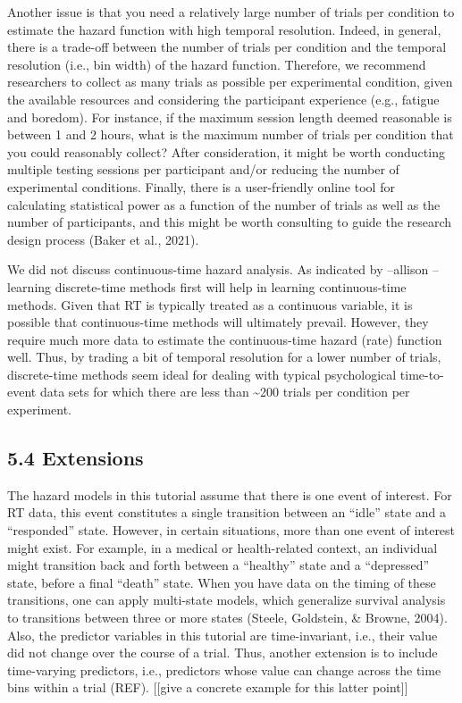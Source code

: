 \documentclass[
  man,floatsintext]{apa6}
\begin{document}
Another issue is that you need a relatively large number of trials per condition to estimate the hazard function with high temporal resolution. Indeed, in general, there is a trade-off between the number of trials per condition and the temporal resolution (i.e., bin width) of the hazard function. Therefore, we recommend researchers to collect as many trials as possible per experimental condition, given the available resources and considering the participant experience (e.g., fatigue and boredom). For instance, if the maximum session length deemed reasonable is between 1 and 2 hours, what is the maximum number of trials per condition that you could reasonably collect? After consideration, it might be worth conducting multiple testing sessions per participant and/or reducing the number of experimental conditions. Finally, there is a user-friendly online tool for calculating statistical power as a function of the number of trials as well as the number of participants, and this might be worth consulting to guide the research design process (Baker et al., 2021).

We did not discuss continuous-time hazard analysis. As indicated by --allison -- learning discrete-time methods first will help in learning continuous-time methods. Given that RT is typically treated as a continuous variable, it is possible that continuous-time methods will ultimately prevail. However, they require much more data to estimate the continuous-time hazard (rate) function well. Thus, by trading a bit of temporal resolution for a lower number of trials, discrete-time methods seem ideal for dealing with typical psychological time-to-event data sets for which there are less than \textasciitilde200 trials per condition per experiment.

\subsection{5.4 Extensions}\label{extensions}

The hazard models in this tutorial assume that there is one event of interest. For RT data, this event constitutes a single transition between an ``idle'' state and a ``responded'' state. However, in certain situations, more than one event of interest might exist. For example, in a medical or health-related context, an individual might transition back and forth between a ``healthy'' state and a ``depressed'' state, before a final ``death'' state. When you have data on the timing of these transitions, one can apply multi-state models, which generalize survival analysis to transitions between three or more states (Steele, Goldstein, \& Browne, 2004).
Also, the predictor variables in this tutorial are time-invariant, i.e., their value did not change over the course of a trial. Thus, another extension is to include time-varying predictors, i.e., predictors whose value can change across the time bins within a trial (REF). {[}{[}give a concrete example for this latter point{]}{]}
\end{document}
